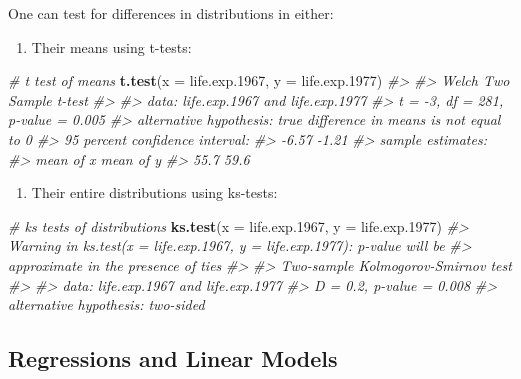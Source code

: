 \documentclass[
]{book}
\newenvironment{Shaded}{\begin{snugshade}}{\end{snugshade}}
\newcommand{\CommentTok}[1]{\textcolor[rgb]{0.56,0.35,0.01}{\textit{#1}}}
\newcommand{\DataTypeTok}[1]{\textcolor[rgb]{0.13,0.29,0.53}{#1}}
\newcommand{\FloatTok}[1]{\textcolor[rgb]{0.00,0.00,0.81}{#1}}
\newcommand{\KeywordTok}[1]{\textcolor[rgb]{0.13,0.29,0.53}{\textbf{#1}}}
\newcommand{\NormalTok}[1]{#1}
\providecommand{\tightlist}{%
  \setlength{\itemsep}{0pt}\setlength{\parskip}{0pt}}
\begin{document}
One can test for differences in distributions in either:

\begin{enumerate}
\def\labelenumi{\arabic{enumi})}
\tightlist
\item
  Their means using t-tests:
\end{enumerate}

\begin{Shaded}
\begin{Highlighting}[]
\CommentTok{# t test of means}
\KeywordTok{t.test}\NormalTok{(}\DataTypeTok{x =}\NormalTok{ life.exp}\FloatTok{.1967}\NormalTok{, }\DataTypeTok{y =}\NormalTok{ life.exp}\FloatTok{.1977}\NormalTok{)}
\CommentTok{#> }
\CommentTok{#>  Welch Two Sample t-test}
\CommentTok{#> }
\CommentTok{#> data:  life.exp.1967 and life.exp.1977}
\CommentTok{#> t = -3, df = 281, p-value = 0.005}
\CommentTok{#> alternative hypothesis: true difference in means is not equal to 0}
\CommentTok{#> 95 percent confidence interval:}
\CommentTok{#>  -6.57 -1.21}
\CommentTok{#> sample estimates:}
\CommentTok{#> mean of x mean of y }
\CommentTok{#>      55.7      59.6}
\end{Highlighting}
\end{Shaded}

\begin{enumerate}
\def\labelenumi{\arabic{enumi})}
\setcounter{enumi}{1}
\tightlist
\item
  Their entire distributions using ks-tests:
\end{enumerate}

\begin{Shaded}
\begin{Highlighting}[]
\CommentTok{# ks tests of distributions}
\KeywordTok{ks.test}\NormalTok{(}\DataTypeTok{x =}\NormalTok{ life.exp}\FloatTok{.1967}\NormalTok{, }\DataTypeTok{y =}\NormalTok{ life.exp}\FloatTok{.1977}\NormalTok{)}
\CommentTok{#> Warning in ks.test(x = life.exp.1967, y = life.exp.1977): p-value will be}
\CommentTok{#> approximate in the presence of ties}
\CommentTok{#> }
\CommentTok{#>  Two-sample Kolmogorov-Smirnov test}
\CommentTok{#> }
\CommentTok{#> data:  life.exp.1967 and life.exp.1977}
\CommentTok{#> D = 0.2, p-value = 0.008}
\CommentTok{#> alternative hypothesis: two-sided}
\end{Highlighting}
\end{Shaded}

\hypertarget{regressions-and-linear-models}{%
\subsection{Regressions and Linear Models}\label{regressions-and-linear-models}}
\end{document}
